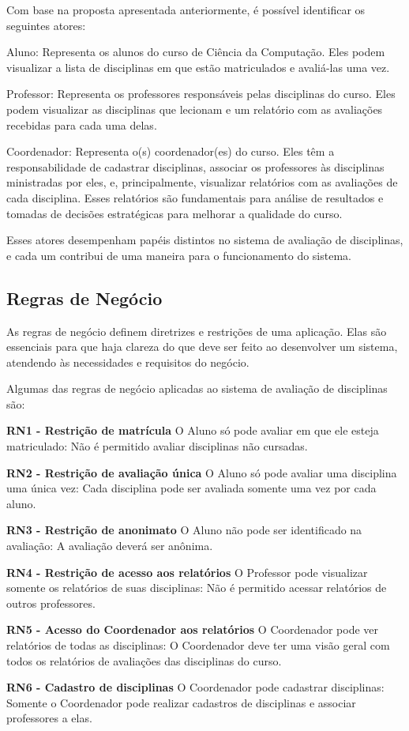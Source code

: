 Com base na proposta apresentada anteriormente, é possível identificar os seguintes atores:

\begin{alineas}
  \item Aluno: Representa os alunos do curso de Ciência da Computação. Eles podem visualizar a lista de disciplinas em que estão matriculados e avaliá-las uma vez.
  \item Professor: Representa os professores responsáveis pelas disciplinas do curso. Eles podem visualizar as disciplinas que lecionam e um relatório com as avaliações recebidas para cada uma delas.
  \item Coordenador: Representa o(s) coordenador(es) do curso. Eles têm a responsabilidade de cadastrar disciplinas, associar os professores às disciplinas ministradas por eles, e, principalmente, visualizar relatórios com as avaliações de cada disciplina. Esses relatórios são fundamentais para análise de resultados e tomadas de decisões estratégicas para melhorar a qualidade do curso.
\end{alineas}

Esses atores desempenham papéis distintos no sistema de avaliação de disciplinas, e cada um contribui de uma maneira para o funcionamento do sistema.

\subsection{Regras de Negócio}
As regras de negócio definem diretrizes e restrições de uma aplicação. Elas são essenciais para que haja clareza do que deve ser feito ao desenvolver um sistema, atendendo às necessidades e requisitos do negócio.

Algumas das regras de negócio aplicadas ao sistema de avaliação de disciplinas são:

\begin{alineas}
  \item \textbf{RN1 - Restrição de matrícula} O Aluno só pode avaliar em que ele esteja matriculado: Não é permitido avaliar disciplinas não cursadas.
  \item \textbf{RN2 - Restrição de avaliação única} O Aluno só pode avaliar uma disciplina uma única vez: Cada disciplina pode ser avaliada somente uma vez por cada aluno.
  \item \textbf{RN3 - Restrição de anonimato} O Aluno não pode ser identificado na avaliação: A avaliação deverá ser anônima.
  \item \textbf{RN4 - Restrição de acesso aos relatórios} O Professor pode visualizar somente os relatórios de suas disciplinas: Não é permitido acessar relatórios de outros professores.
  \item \textbf{RN5 - Acesso do Coordenador aos relatórios} O Coordenador pode ver relatórios de todas as disciplinas: O Coordenador deve ter uma visão geral com todos os relatórios de avaliações das disciplinas do curso.
  \item \textbf{RN6 - Cadastro de disciplinas} O Coordenador pode cadastrar disciplinas: Somente o Coordenador pode realizar cadastros de disciplinas e associar professores a elas.
\end{alineas}

